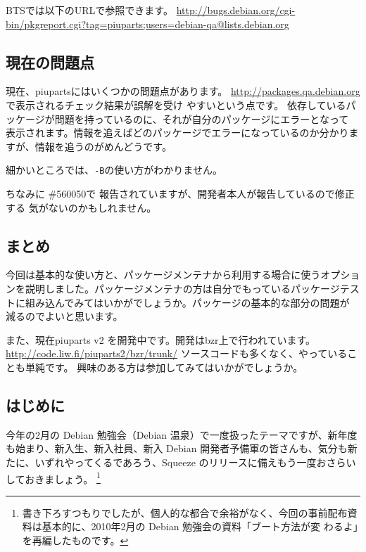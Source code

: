 \documentclass[mingoth,a4paper]{jsarticle}
\begin{document}
BTSでは以下のURLで参照できます。
\url{http://bugs.debian.org/cgi-bin/pkgreport.cgi?tag=piuparts;users=debian-qa@lists.debian.org}

\subsection{現在の問題点}
現在、piupartsにはいくつかの問題点があります。
\url{http://packages.qa.debian.org}で表示されるチェック結果が誤解を受け
やすいという点です。
依存しているパッケージが問題を持っているのに、それが自分のパッケージにエラーとなって
表示されます。情報を追えばどのパッケージでエラーになっているのか分かりま
すが、情報を追うのがめんどうです。

細かいところでは、\texttt{-B}の使い方がわかりません。
ちなみに \#560050で 報告されていますが、開発者本人が報告しているので修正する
気がないのかもしれません。

\subsection{まとめ}

今回は基本的な使い方と、パッケージメンテナから利用する場合に使うオプショ
ンを説明しました。パッケージメンテナの方は自分でもっているパッケージテス
トに組み込んでみてはいかがでしょうか。パッケージの基本的な部分の問題が
減るのでよいと思います。

また、現在piuparts v2 を開発中です。開発はbzr上で行われています。
\url{http://code.liw.fi/piuparts2/bzr/trunk/}
ソースコードも多くなく、やっていることも単純です。
興味のある方は参加してみてはいかがでしょうか。


\subsection{はじめに}
今年の2月の Debian 勉強会（Debian 温泉）で一度扱ったテーマですが、新年度
も始まり、新入生、新入社員、新入 Debian 開発者予備軍の皆さんも、気分も新
たに、いずれやってくるであろう、Squeeze のリリースに備えもう一度おさらい
しておきましょう。
\footnote{書き下ろすつもりでしたが、個人的な都合で余裕がなく、今回の事前配布資料は基本的に、2010年2月の Debian 勉強会の資料「ブート方法が変
わるよ」を再編したものです。}
\end{document}
